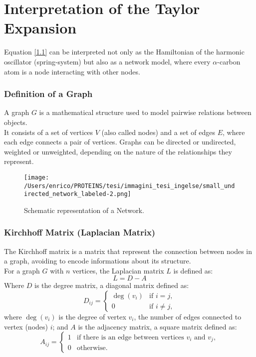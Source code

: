 \documentclass[English, Lau, oneside]{sapthesis}
\begin{document}
\section{Interpretation of the Taylor Expansion}
\noindent Equation \eqref{1.1} can be interpreted not only as the Hamiltonian of the harmonic oscillator (spring-system) but also as a network model, where every \(\alpha\)-carbon atom is a node interacting with other nodes.\cite{ref9}

\subsubsection{Definition of a Graph}
\noindent 
A graph \( G \) is a mathematical structure used to model pairwise relations between objects.\\ It consists of a set of vertices \( V \) (also called nodes) and a set of edges \( E \), where each edge connects a pair of vertices.
Graphs can be directed or undirected, weighted or unweighted, depending on the nature of the relationships they represent.\cite{ref11}\\

\begin{figure}[h]
    \centering
    \texttt{[image: /Users/enrico/PROTEINS/tesi/immagini\_tesi\_ingelse/small\_undirected\_network\_labeled-2.png]}

    \caption{Schematic representation of a Network.}
    \label{fig:Network}
\end{figure}

\subsubsection{Kirchhoff Matrix (Laplacian Matrix)}
\noindent The Kirchhoff matrix is a matrix that represent the connection between nodes in a graph, avoiding to encode informations about its structure.\\
For a graph \( G \) with \( n \) vertices, the Laplacian matrix \( L \) is defined as:\cite{ref11}
\begin{equation}
    L = D - A \label{Kirchhoff}
\end{equation}
Where \( D \) is the degree matrix, a diagonal matrix defined as:
\begin{equation}
    D_{ij} = 
    \begin{cases} 
      \deg(v_i) & \text{if } i = j, \\
      0 & \text{if } i \neq j,
    \end{cases}
\end{equation}
where \( \deg(v_i) \) is the degree of vertex \( v_i \), the number of edges connected to vertex (nodes) \( i \);  and \( A \) is the adjacency matrix, a square matrix defined as:
\begin{equation}
    A_{ij} = 
    \begin{cases} 
      1 & \text{if there is an edge between vertices } v_i \text{ and } v_j, \\
      0 & \text{otherwise}.
    \end{cases}
\end{equation}
\end{document}
